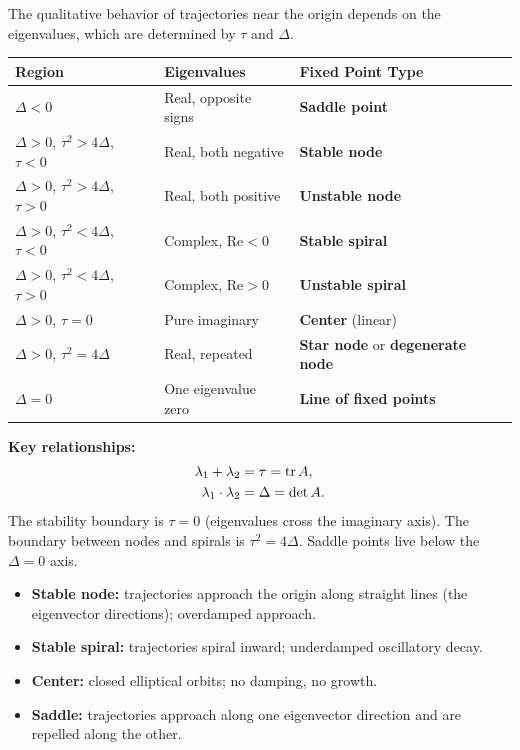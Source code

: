 \documentclass[11pt,letterpaper]{article}
\theoremstyle{definition}
\theoremstyle{plain}
\theoremstyle{remark}
\begin{document}
The qualitative behavior of trajectories near the origin depends on the
eigenvalues, which are determined by $\tau$ and $\Delta$.

\begin{keyresult}
\begin{center}
\renewcommand{\arraystretch}{1.3}
\begin{tabular}{@{}lll@{}}
\toprule
\textbf{Region} & \textbf{Eigenvalues} & \textbf{Fixed Point Type} \\
\midrule
$\Delta < 0$ & Real, opposite signs & \textbf{Saddle point} \\
$\Delta > 0$, $\tau^2 > 4\Delta$, $\tau < 0$ & Real, both negative
  & \textbf{Stable node} \\
$\Delta > 0$, $\tau^2 > 4\Delta$, $\tau > 0$ & Real, both positive
  & \textbf{Unstable node} \\
$\Delta > 0$, $\tau^2 < 4\Delta$, $\tau < 0$ & Complex, $\text{Re}<0$
  & \textbf{Stable spiral} \\
$\Delta > 0$, $\tau^2 < 4\Delta$, $\tau > 0$ & Complex, $\text{Re}>0$
  & \textbf{Unstable spiral} \\
$\Delta > 0$, $\tau = 0$ & Pure imaginary
  & \textbf{Center} (linear) \\
$\Delta > 0$, $\tau^2 = 4\Delta$ & Real, repeated
  & \textbf{Star node} or \textbf{degenerate node} \\
$\Delta = 0$ & One eigenvalue zero
  & \textbf{Line of fixed points} \\
\bottomrule
\end{tabular}
\end{center}
\end{keyresult}

\noindent\textbf{Key relationships:}
\begin{align}
  \lambda_1 + \lambda_2 &= \tau = \tr A, \\
  \lambda_1 \cdot \lambda_2 &= \Delta = \det A.
\end{align}
The stability boundary is $\tau = 0$ (eigenvalues cross the imaginary axis).
The boundary between nodes and spirals is $\tau^2 = 4\Delta$.
Saddle points live below the $\Delta = 0$ axis.

\begin{physicalnote}
\begin{itemize}[leftmargin=2em]
\item \textbf{Stable node:} trajectories approach the origin along
      straight lines (the eigenvector directions); overdamped approach.
\item \textbf{Stable spiral:} trajectories spiral inward; underdamped
      oscillatory decay.
\item \textbf{Center:} closed elliptical orbits; no damping, no growth.
\item \textbf{Saddle:} trajectories approach along one eigenvector
      direction and are repelled along the other.
\end{itemize}
\end{physicalnote}
\end{document}
